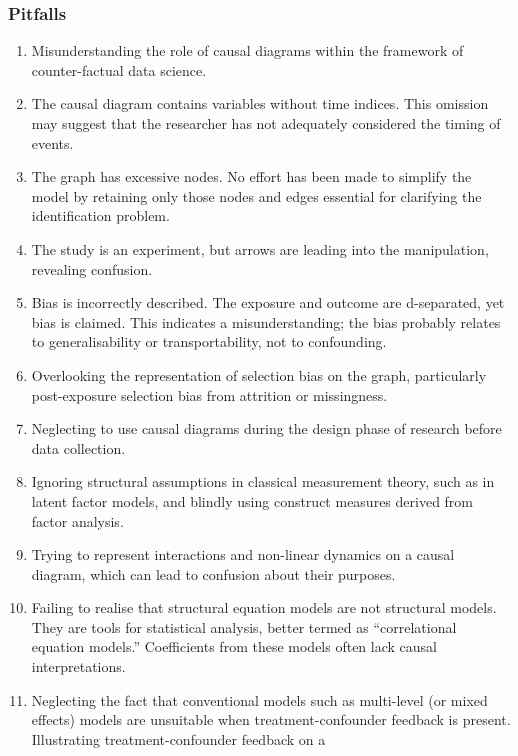 \documentclass[
  singlecolumn,
  9pt]{article}
\begin{document}
\subsubsection{Pitfalls}\label{pitfalls}

\begin{enumerate}
\def\labelenumi{\arabic{enumi}.}
\item
  Misunderstanding the role of causal diagrams within the framework of
  counter-factual data science.
\item
  The causal diagram contains variables without time indices. This
  omission may suggest that the researcher has not adequately considered
  the timing of events.
\item
  The graph has excessive nodes. No effort has been made to simplify the
  model by retaining only those nodes and edges essential for clarifying
  the identification problem.
\item
  The study is an experiment, but arrows are leading into the
  manipulation, revealing confusion.
\item
  Bias is incorrectly described. The exposure and outcome are
  d-separated, yet bias is claimed. This indicates a misunderstanding;
  the bias probably relates to generalisability or transportability, not
  to confounding.
\item
  Overlooking the representation of selection bias on the graph,
  particularly post-exposure selection bias from attrition or
  missingness.
\item
  Neglecting to use causal diagrams during the design phase of research
  before data collection.
\item
  Ignoring structural assumptions in classical measurement theory, such
  as in latent factor models, and blindly using construct measures
  derived from factor analysis.
\item
  Trying to represent interactions and non-linear dynamics on a causal
  diagram, which can lead to confusion about their purposes.
\item
  Failing to realise that structural equation models are not structural
  models. They are tools for statistical analysis, better termed as
  ``correlational equation models.'' Coefficients from these models
  often lack causal interpretations.
\item
  Neglecting the fact that conventional models such as multi-level (or
  mixed effects) models are unsuitable when treatment-confounder
  feedback is present. Illustrating treatment-confounder feedback on a

\end{enumerate}
\end{document}
